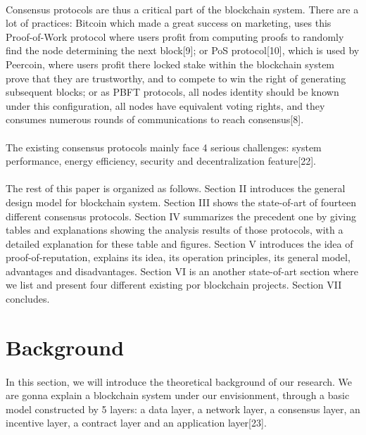 \documentclass[]{article}
\begin{document}
\begin{CJK*}{UTF8}{gbsn}
\paragraph{}
	Consensus protocols are thus a critical part of the blockchain system. There are a lot of practices: Bitcoin which made a great success on marketing, uses this Proof-of-Work protocol where users profit from computing proofs to randomly find the node determining the next block[9]; or PoS protocol[10], which is used by Peercoin, where users profit there locked stake within the blockchain system prove that they are trustworthy, and to compete to win the right of generating subsequent blocks; or as PBFT protocols, all nodes identity should be known under this configuration, all nodes have equivalent voting rights, and they consumes numerous rounds of communications to reach consensus[8].
	\paragraph{} 
	The existing consensus protocols mainly face 4 serious challenges: system performance, energy efficiency, security and decentralization feature[22].
\paragraph{} The rest of this paper is organized as follows. Section II introduces the general design model for blockchain system. Section III shows the state-of-art of fourteen different consensus protocols. Section IV summarizes the precedent one by giving tables and explanations showing the analysis results of those protocols, with a detailed explanation for these table and figures. Section V introduces the idea of proof-of-reputation, explains its idea, its operation principles, its general model, advantages and disadvantages. Section VI is an another state-of-art section where we list and present four different existing por blockchain projects. %
 Section VII concludes.
\section{Background}
\paragraph{}
	In this section, we will introduce the theoretical background of our research. We are gonna explain a blockchain system under our envisionment, through a basic model constructed by 5 layers: a data layer, a network layer, a consensus layer, an incentive layer, a contract layer and an application layer[23].

\end{CJK*}
\end{document}
